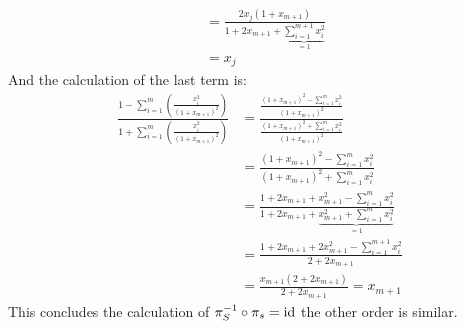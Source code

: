 \begin{remark}
\begin{align}
        & = \frac{2x_j(1+x_{m+1})}{1+2 x_{m+1}+\underbrace{\sum_{i=1}^{m+1} x_i^2}_{=1}} \\
        & = x_j
    \end{align}
    And the calculation of the last term is:
    \begin{align*}
        \frac{1-\sum_{i=1}^m(\frac{x_i^2}{(1+x_{m+1})^2})}{1+\sum_{i=1}^m(\frac{x_i^2}{(1+x_{m+1})^2})} 
        & = \frac{\frac{(1+x_{m+1})^2-\sum_{i=1}^m x_i^2}{(1+x_{m+1})^2}}{\frac{(1+x_{m+1})^2+\sum_{i=1}^m x_i^2}{(1+x_{m+1})^2}}\\
        & =\frac{(1+x_{m+1})^2-\sum_{i=1}^m x_i^2}{(1+x_{m+1})^2+\sum_{i=1}^m x_i^2} \\
        & = \frac{1+2x_{m+1}+x_{m+1}^2-\sum_{i=1}^m x_i^2}{1+2x_{m+1}+\underbrace{x_{m+1}^2+\sum_{i=1}^m x_i^2}_{=1}} \\
        & = \frac{1+2x_{m+1}+2x_{m+1}^2-\sum_{i=1}^{m+1} x_i^2}{2+2x_{m+1}} \\
        & = \frac{x_{m+1}(2+2x_{m+1})}{2+2x_{m+1}}=x_{m+1}
    \end{align*}
This concludes the calculation of $\pi_S^{-1}\circ \pi_s=\text{id}$ the other order is similar.
\end{remark}




